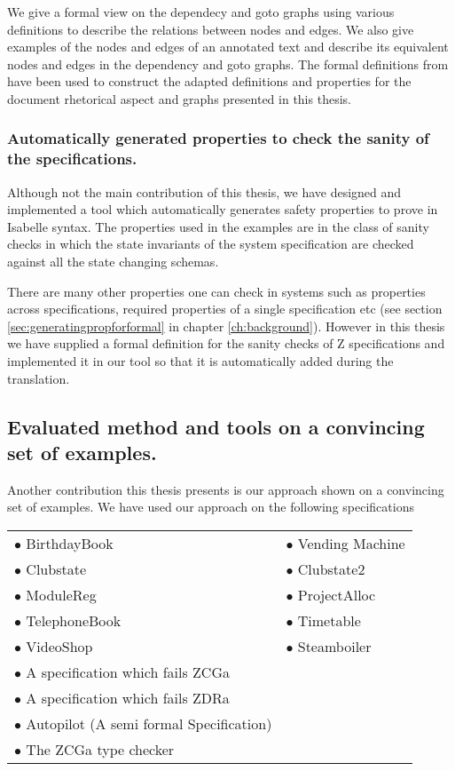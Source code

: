 We give a formal view on the dependecy and goto graphs using various definitions to describe the relations between nodes and edges. We also give examples of the nodes and edges of an annotated text and describe its equivalent nodes and edges in the dependency and goto graphs. The formal definitions from \cite{zengfirstyear} have been used to construct the adapted definitions and properties for the document rhetorical aspect and graphs presented in this thesis.

\subsubsection{Automatically generated properties to check the sanity of the specifications.}

Although not the main contribution of this thesis, we have designed and implemented a tool which automatically generates safety properties to prove in Isabelle syntax. The properties used in the examples are in the class of sanity checks in which the state invariants of the system specification are checked against all the state changing schemas.

There are many other properties one can check in systems such as properties across specifications, required properties of a single specification etc (see section \ref{sec:generatingpropforformal} in chapter \ref{ch:background}). However in this thesis we have supplied a formal definition for the sanity checks of Z specifications and implemented it in our tool so that it is automatically added during the translation.


\subsection{Evaluated method and tools on a convincing set of examples.}


Another contribution this thesis presents is our approach shown on a convincing set of examples. We have used our approach on the following specifications

\begin{tabular}{l l}
$\bullet$ BirthdayBook \cite{spiveyreferencemanual} & $\bullet$ Vending Machine \cite{pp} \\
$\bullet$ Clubstate \cite{essenceofz} & $\bullet$ Clubstate2 \cite{essenceofz} \\
$\bullet$ ModuleReg \cite{essenceofz} & $\bullet$ ProjectAlloc \cite{essenceofz} \\
$\bullet$ TelephoneBook & $\bullet$ Timetable \cite{essenceofz} \\
$\bullet$ VideoShop \cite{essenceofz} & $\bullet$ Steamboiler \\
$\bullet$ A specification which fails ZCGa & \\
$\bullet$ A specification which fails ZDRa & \\
$\bullet$ Autopilot (A semi formal Specification) \cite{Butler96} & \\
$\bullet$ The ZCGa type checker & \\
\end{tabular}

